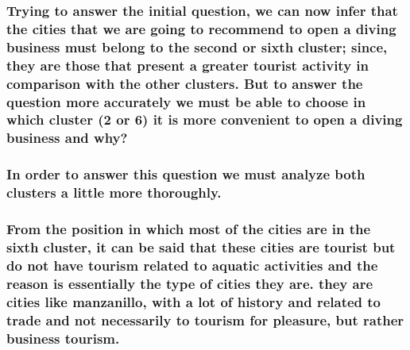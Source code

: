 \documentclass[11pt]{article}
\begin{document}
\hypertarget{trying-to-answer-the-initial-question-we-can-now-infer-that-the-cities-that-we-are-going-to-recommend-to-open-a-diving-business-must-belong-to-the-second-or-sixth-cluster-since-they-are-those-that-present-a-greater-tourist-activity-in-comparison-with-the-other-clusters.-but-to-answer-the-question-more-accurately-we-must-be-able-to-choose-in-which-cluster-2-or-6-it-is-more-convenient-to-open-a-diving-business-and-why}{%
\subsubsection{Trying to answer the initial question, we can now infer
that the cities that we are going to recommend to open a diving business
must belong to the second or sixth cluster; since, they are those that
present a greater tourist activity in comparison with the other
clusters. But to answer the question more accurately we must be able to
choose in which cluster (2 or 6) it is more convenient to open a diving
business and
why?}\label{trying-to-answer-the-initial-question-we-can-now-infer-that-the-cities-that-we-are-going-to-recommend-to-open-a-diving-business-must-belong-to-the-second-or-sixth-cluster-since-they-are-those-that-present-a-greater-tourist-activity-in-comparison-with-the-other-clusters.-but-to-answer-the-question-more-accurately-we-must-be-able-to-choose-in-which-cluster-2-or-6-it-is-more-convenient-to-open-a-diving-business-and-why}}

\hypertarget{in-order-to-answer-this-question-we-must-analyze-both-clusters-a-little-more-thoroughly.}{%
\subsubsection{In order to answer this question we must analyze both
clusters a little more
thoroughly.}\label{in-order-to-answer-this-question-we-must-analyze-both-clusters-a-little-more-thoroughly.}}

\hypertarget{from-the-position-in-which-most-of-the-cities-are-in-the-sixth-cluster-it-can-be-said-that-these-cities-are-tourist-but-do-not-have-tourism-related-to-aquatic-activities-and-the-reason-is-essentially-the-type-of-cities-they-are.-they-are-cities-like-manzanillo-with-a-lot-of-history-and-related-to-trade-and-not-necessarily-to-tourism-for-pleasure-but-rather-business-tourism.}{%
\subsubsection{From the position in which most of the cities are in the
sixth cluster, it can be said that these cities are tourist but do not
have tourism related to aquatic activities and the reason is essentially
the type of cities they are. they are cities like manzanillo, with a lot
of history and related to trade and not necessarily to tourism for
pleasure, but rather business
tourism.}\label{from-the-position-in-which-most-of-the-cities-are-in-the-sixth-cluster-it-can-be-said-that-these-cities-are-tourist-but-do-not-have-tourism-related-to-aquatic-activities-and-the-reason-is-essentially-the-type-of-cities-they-are.-they-are-cities-like-manzanillo-with-a-lot-of-history-and-related-to-trade-and-not-necessarily-to-tourism-for-pleasure-but-rather-business-tourism.}}
\end{document}

